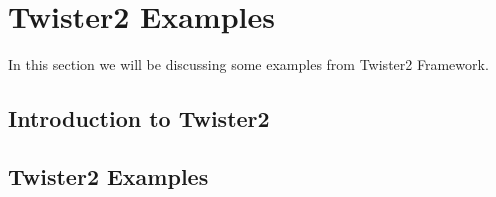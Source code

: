 \MDNAME\

\section{Twister2 Examples}

\label{s:twister} 

In this section we will be discussing some examples from Twister2
Framework.

\subsection{Introduction to Twister2}

\subsection{Twister2 Examples}

